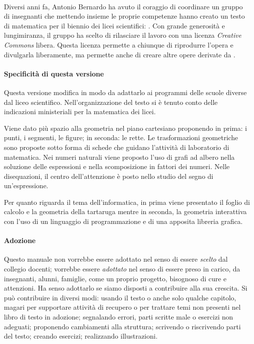 \paragraph{\serie}
Diversi anni fa, Antonio Bernardo ha avuto il coraggio di coordinare un
gruppo di insegnanti che mettendo insieme le proprie competenze hanno creato
un testo di matematica per il biennio dei licei scientifici: \emph{\serie}.
Con grande generosità e lungimiranza, il gruppo ha scelto di rilasciare il
lavoro con una licenza \textit{Creative Commons} libera.
Questa licenza permette
a chiunque di riprodurre l'opera e divulgarla liberamente, ma permette anche
di creare altre opere derivate da \emph{\serie}.

\paragraph{Specificità di questa versione} Questa versione modifica
\emph{\serie} in modo da adattarlo ai programmi delle scuole diverse dal liceo
scientifico. Nell'organizzazione del testo si è tenuto conto delle
indicazioni ministeriali per la matematica dei licei.

Viene dato più spazio alla geometria nel piano cartesiano proponendo in
prima: i punti, i segmenti, le figure; in seconda: le rette.
Le trasformazioni geometriche sono proposte sotto forma di schede
che guidano l'attività di laboratorio di matematica.
Nei numeri naturali viene proposto l'uso di grafi ad albero nella soluzione
delle espressioni e nella scomposizione in fattori dei numeri.
Nelle disequazioni, il centro dell'attenzione è posto nello studio
del segno di un'espressione.

Per quanto riguarda il tema dell'informatica, in prima viene presentato il
foglio di calcolo e la geometria della tartaruga mentre
in seconda, la geometria interattiva con l'uso di un linguaggio di
programmazione e di una apposita libreria grafica.

\paragraph{Adozione} Questo manuale non vorrebbe essere adottato nel
senso di essere \emph{scelto} dal collegio docenti; vorrebbe essere
\emph{adottato} nel senso di essere preso in carico, da insegnanti, alunni,
famiglie, come un proprio progetto, bisognoso di cure e attenzioni.
Ha senso adottarlo se siamo disposti a contribuire alla sua crescita.
Si può contribuire in diversi modi:
 usando il testo o anche solo qualche capitolo, magari per supportare
 attività di recupero o per trattare temi non presenti nel libro di
 testo in adozione;
 segnalando errori, parti scritte male o esercizi non adeguati;
 proponendo cambiamenti alla struttura;
 scrivendo o riscrivendo parti del testo;
 creando esercizi;
 realizzando illustrazioni.


